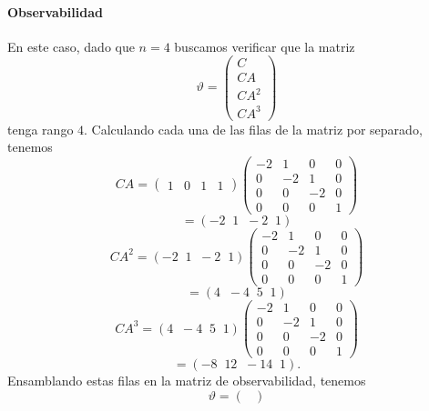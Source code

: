\documentclass[
  11pt,
  letterpaper,
   addpoints,
   answers
  ]{exam}
\begin{document}
\begin{questions}
\begin{solution}
\paragraph*{Observabilidad}
En este caso, dado que $n=4$ buscamos verificar que la matriz
\setcounter{equation}{42}
\begin{equation}
\vartheta =
\begin{pmatrix}
C\\
CA\\
CA^{2}\\
CA^{3}
\end{pmatrix}
\end{equation}
tenga rango $4$. Calculando cada una de las filas de la matriz por separado, tenemos
\begin{equation}
CA=\begin{pmatrix}1&0&1&1\end{pmatrix}
\begin{pmatrix}
-2&1&0&0\\
0&-2&1&0\\
0&0&-2&0\\
0&0&0&1
\end{pmatrix}
\end{equation}
\begin{equation}
=(-2\;\;1\;\;-2\;\;1)
\end{equation}
\begin{equation}
CA^{2}=(-2\;\;1\;\;-2\;\;1)
\begin{pmatrix}
-2&1&0&0\\
0&-2&1&0\\
0&0&-2&0\\
0&0&0&1
\end{pmatrix}
\end{equation}
\begin{equation}
=(4\;\;-4\;\;5\;\;1)
\end{equation}
\begin{equation}
CA^{3}=(4\;\;-4\;\;5\;\;1)
\begin{pmatrix}
-2&1&0&0\\
0&-2&1&0\\
0&0&-2&0\\
0&0&0&1
\end{pmatrix}
\end{equation}
\begin{equation}
=(-8\;\;12\;\;-14\;\;1).
\end{equation}
Ensamblando estas filas en la matriz de observabilidad, tenemos
\begin{equation}
\vartheta=
\begin{pmatrix}

\end{pmatrix}
\end{equation}
\end{solution}
\end{questions}
\end{document}
